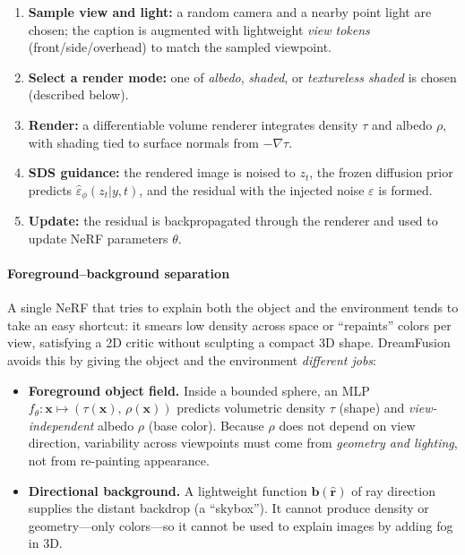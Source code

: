 \begin{enrichment}
\begin{enrichment}
        \begin{enumerate}
            \item \textbf{Sample view and light:} a random camera and a nearby point light are chosen; the caption is augmented with lightweight \emph{view tokens} (front/side/overhead) to match the sampled viewpoint.
            \item \textbf{Select a render mode:} one of \emph{albedo}, \emph{shaded}, or \emph{textureless shaded} is chosen (described below).
            \item \textbf{Render:} a differentiable volume renderer integrates density \(\tau\) and albedo \(\rho\), with shading tied to surface normals from \(-\nabla\tau\).
            \item \textbf{SDS guidance:} the rendered image is noised to \(z_t\), the frozen diffusion prior predicts \(\hat\varepsilon_\phi(z_t|y,t)\), and the residual with the injected noise \(\varepsilon\) is formed.
            \item \textbf{Update:} the residual is backpropagated through the renderer and used to update NeRF parameters \(\theta\).
        \end{enumerate}
        
        \paragraph{Foreground–background separation}
        \label{par:chapter23_dreamfusion_heads}
        A single NeRF that tries to explain both the object and the environment tends to take an easy shortcut: it smears low density across space or “repaints” colors per view, satisfying a 2D critic without sculpting a compact 3D shape. DreamFusion avoids this by giving the object and the environment \emph{different jobs}:
        
        \begin{itemize}
            \item \textbf{Foreground object field.} Inside a bounded sphere, an MLP
            \(f_\theta:\mathbf{x}\mapsto(\tau(\mathbf{x}),\,\rho(\mathbf{x}))\)
            predicts volumetric density \(\tau\) (shape) and \emph{view-independent} albedo \(\rho\) (base color). Because \(\rho\) does not depend on view direction, variability across viewpoints must come from \emph{geometry and lighting}, not from re-painting appearance.
            
            \item \textbf{Directional background.} A lightweight function \(\mathbf{b}(\hat{\mathbf{r}})\) of ray direction supplies the distant backdrop (a “skybox”). It cannot produce density or geometry—only colors—so it cannot be used to explain images by adding fog in 3D.
        \end{itemize}
        

\end{enrichment}
\end{enrichment}
